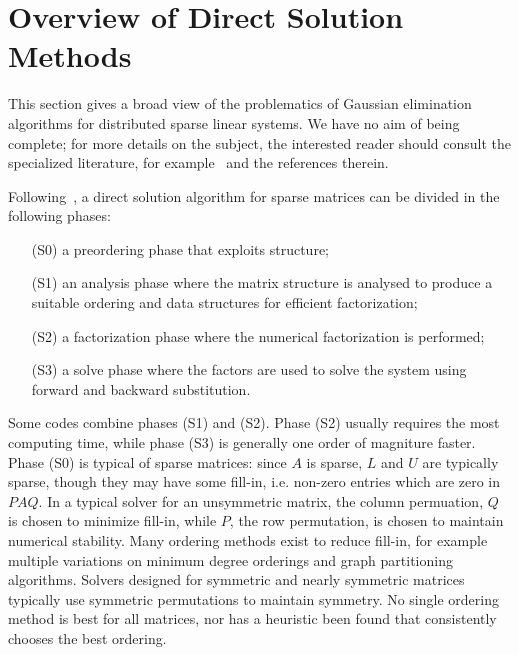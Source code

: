 \documentclass[acmtocl]{acmtrans2m}
\begin{document}
\section{Overview of Direct Solution Methods}
\label{sec:overview}

This section gives a broad view of the problematics of Gaussian elimination
algorithms for distributed sparse linear systems. We have no aim of being
complete; for more details on the subject, the interested reader should
consult the specialized literature, for
example~\cite{duff86direct,duff97sparse} and the references therein. 

\smallskip

Following~\cite[Chapter 6]{dongarra98numerical}, a direct solution algorithm
for sparse matrices can be divided in the following phases:
\begin{itemize}
\item[(S0)] a preordering phase that exploits structure;
\item[(S1)] an analysis phase where the matrix structure is analysed to produce a
suitable ordering and data structures for efficient factorization;
\item[(S2)] a factorization phase where the numerical factorization is performed;
\item[(S3)] a solve phase where the factors are used to solve the system using
forward and backward substitution.
\end{itemize}
Some codes combine phases (S1) and (S2). Phase (S2) usually requires the most
computing time, while phase (S3) is generally one order of magniture faster.
Phase (S0) is typical of sparse matrices:
since $A$ is sparse, $L$ and $U$ are typically sparse, though they may have some
fill-in, i.e. non-zero entries which are zero in $PAQ$.  
In a typical solver for an unsymmetric matrix, the column permuation,
$Q$ is chosen to minimize fill-in, while $P$, the row permutation, is
chosen to maintain numerical stability.  
Many ordering methods exist to reduce fill-in, for example multiple variations
on minimum degree orderings and graph partitioning algorithms.  Solvers
designed for symmetric and nearly symmetric matrices typically use symmetric
permutations to maintain symmetry.  No single ordering method is best for all
matrices, nor has a heuristic been found that consistently chooses the best
ordering.
\end{document}
